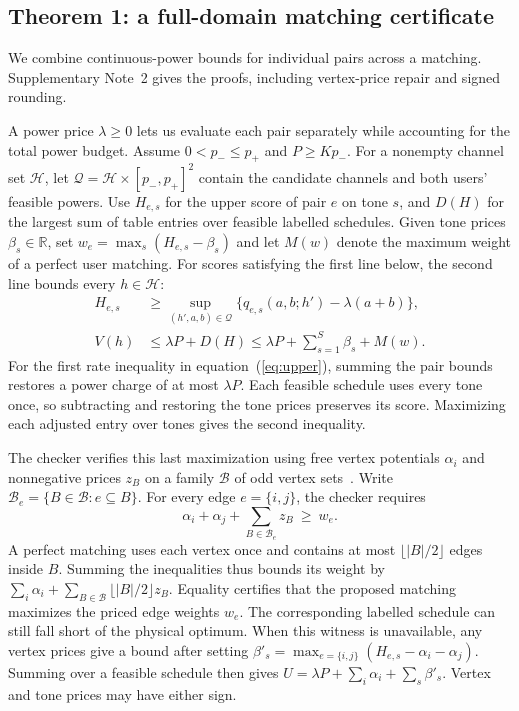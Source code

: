\documentclass[11pt,letterpaper]{article}
\begin{document}
\subsection*{Theorem 1: a full-domain matching certificate}
We combine continuous-power bounds for individual pairs across a matching. Supplementary Note~2 gives the proofs, including vertex-price repair and signed rounding.

A power price \(\lambda\geq0\) lets us evaluate each pair separately while accounting for the total power budget. Assume \(0<p_-\leq p_+\) and \(P\geq Kp_-\). For a nonempty channel set \(\mathcal H\), let \(\mathcal Q=\mathcal H\times[p_-,p_+]^2\) contain the candidate channels and both users' feasible powers. Use \(H_{e,s}\) for the upper score of pair \(e\) on tone \(s\), and \(D(H)\) for the largest sum of table entries over feasible labelled schedules. Given tone prices \(\beta_s\in\mathbb R\), set \(w_e=\max_s(H_{e,s}-\beta_s)\) and let \(M(w)\) denote the maximum weight of a perfect user matching. For scores satisfying the first line below, the second line bounds every \(h\in\mathcal H\):
\begin{equation}
\begin{aligned}
 H_{e,s} &\geq \sup_{(h',a,b)\in\mathcal Q}
       \bigl\{q_{e,s}(a,b;h')-\lambda(a+b)\bigr\},\\[2pt]
 V(h)&\leq\lambda P+D(H)\leq\lambda P+\sum_{s=1}^{S}\beta_s+M(w).
\end{aligned}
\label{eq:upper}
\end{equation}
For the first rate inequality in equation~(\ref{eq:upper}), summing the pair bounds restores a power charge of at most \(\lambda P\). Each feasible schedule uses every tone once, so subtracting and restoring the tone prices preserves its score. Maximizing each adjusted entry over tones gives the second inequality.

The checker verifies this last maximization using free vertex potentials \(\alpha_i\) and nonnegative prices \(z_B\) on a family \(\mathcal B\) of odd vertex sets~\cite{edmonds}. Write \(\mathcal B_e=\{B\in\mathcal B:e\subseteq B\}\). For every edge \(e=\{i,j\}\), the checker requires
\[
 \alpha_i+\alpha_j+\sum_{B\in\mathcal B_e}z_B\ \geq\ w_e .
\]
A perfect matching uses each vertex once and contains at most \(\lfloor |B|/2\rfloor\) edges inside \(B\). Summing the inequalities thus bounds its weight by \(\sum_i\alpha_i+\sum_{B\in\mathcal B}\lfloor |B|/2\rfloor z_B\). Equality certifies that the proposed matching maximizes the priced edge weights \(w_e\). The corresponding labelled schedule can still fall short of the physical optimum. When this witness is unavailable, any vertex prices give a bound after setting \(\beta'_s=\max_{e=\{i,j\}}(H_{e,s}-\alpha_i-\alpha_j)\). Summing over a feasible schedule then gives \(U=\lambda P+\sum_i\alpha_i+\sum_s\beta'_s\). Vertex and tone prices may have either sign.
\end{document}
